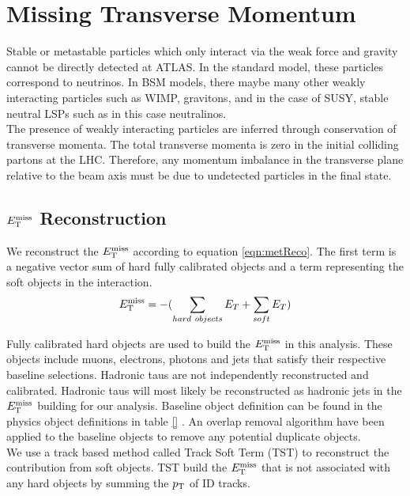 \section{Missing Transverse Momentum}
\label{sec:reco:MET}

\indent Stable or metastable particles which only interact via the weak force and gravity cannot be directly detected at ATLAS.  In the standard model, these particles correspond to neutrinos.  In BSM models, there maybe many other weakly interacting particles such as WIMP, gravitons, and in the case of SUSY, stable neutral LSPs such as in this case neutralinos. \\

\indent The presence of weakly interacting particles are inferred through conservation of transverse momenta.  The total transverse momenta is zero in the initial colliding partons at the LHC.  Therefore, any momentum imbalance in the transverse plane relative to the beam axis must be due to undetected particles in the final state.  \\

\subsection{$E_{\mathrm{T}}^{\mathrm{miss}}$ Reconstruction}
\label{sec:MET:reco}

\indent We reconstruct the $E_{\mathrm{T}}^{\mathrm{miss}}$ according to equation \ref{eqn:metReco}.  The first term is a negative vector sum of hard fully calibrated objects and a term representing the soft objects in the interaction.  \\

\begin{equation}
E_{\mathrm{T}}^{\mathrm{miss}} = - ( \sum_{hard~objects} E_T + \sum_{soft} E_T ) 
\label{eqn:metReco}
\end{equation}

\indent Fully calibrated hard objects are used to build the $E_{\mathrm{T}}^{\mathrm{miss}}$ in this analysis.  These objects include muons, electrons, photons and jets that satisfy their respective baseline selections.  Hadronic taus are not independently reconstructed and calibrated.  Hadronic taus will most likely be reconstructed as hadronic jets in the $E_{\mathrm{T}}^{\mathrm{miss}}$ building for our analysis.  Baseline object definition can be found in the physics object definitions in table \ref{} .  An overlap removal algorithm have been applied to the baseline objects to remove any potential duplicate objects. \\

\indent We use a track based method called Track Soft Term (TST) \cite{METReco} to reconstruct the contribution from soft objects.  TST build the $E_{\mathrm{T}}^{\mathrm{miss}}$ that is not associated with any hard objects by summing the $p_{\mathrm{T}}$ of ID tracks. \\

